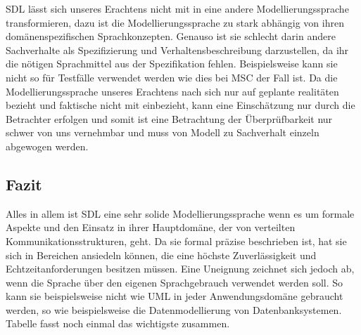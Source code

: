 \ac{SDL} lässt sich unseres Erachtens nicht mit in eine andere Modellierungssprache transformieren, dazu ist die Modellierungssprache zu stark abhängig von ihren domänenspezifischen Sprachkonzepten. Genauso ist sie schlecht darin andere Sachverhalte als Spezifizierung und Verhaltensbeschreibung darzustellen, da ihr die nötigen Sprachmittel aus der Spezifikation fehlen. Beispielsweise kann sie nicht so für Testfälle verwendet werden wie dies bei \ac{MSC} der Fall ist.
Da die Modellierungssprache unseres Erachtens nach sich nur auf geplante realitäten bezieht und faktische nicht mit einbezieht, kann eine Einschätzung nur durch die Betrachter erfolgen und somit ist eine Betrachtung der Überprüfbarkeit nur schwer von uns vernehmbar und muss von Modell zu Sachverhalt einzeln abgewogen werden.

\subsection{Fazit}
\label{ssc:SDL_Fazit}
Alles in allem ist \ac{SDL} eine sehr solide Modellierungssprache wenn es um formale Aspekte und den Einsatz in ihrer Hauptdomäne, der von verteilten Kommunikationsstrukturen, geht. Da sie formal präzise beschrieben ist, hat sie sich in Bereichen ansiedeln können, die eine höchste Zuverlässigkeit und Echtzeitanforderungen besitzen müssen. Eine Uneignung zeichnet sich jedoch ab, wenn die Sprache über den eigenen Sprachgebrauch verwendet werden soll. So kann sie beispielsweise nicht wie \ac{UML} in jeder Anwendungsdomäne gebraucht werden, so wie beispielsweise die Datenmodellierung von Datenbanksystemen. Tabelle \pageref{tab:EignungSDL} fasst noch einmal das wichtigste zusammen.

